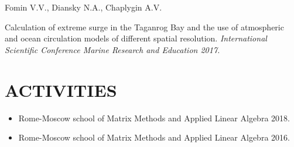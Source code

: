 \documentclass[paper=a4,fontsize=11pt]{scrartcl}
\newcommand{\sepspace}{\vspace*{1em}}		%
\newcommand{\NewPart}[1]{\section*{\uppercase{#1}}}
\begin{document}
Fomin V.V., Diansky N.A., Chaplygin A.V.

Calculation of extreme surge in the Taganrog Bay and the use of atmospheric and ocean circulation models of different spatial resolution.
\textit{International Scientific Conference Marine Research and Education 2017. }

\NewPart{Activities}{}
\begin{itemize}
 \item
Rome-Moscow school of Matrix Methods and Applied Linear Algebra 2018. 
\sepspace

\item
Rome-Moscow school of Matrix Methods and Applied Linear Algebra 2016.

\end{itemize}
\end{document}
